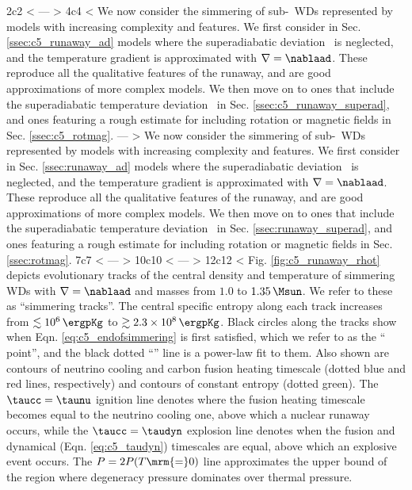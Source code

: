 2c2
< \label{sec:c5_results}
---
> \label{sec:results}
4c4
< We now consider the simmering of sub-\Mch\ WDs represented by models with increasing complexity and features.  We first consider in Sec. \ref{ssec:c5_runaway_ad} models where the superadiabatic deviation \dnabconv\ is neglected, and the temperature gradient is approximated with $\nabla = \nablaad$. These reproduce all the qualitative features of the runaway, and are good approximations of more complex models.  We then move on to ones that include the superadiabatic temperature deviation \dnabconv\ in Sec. \ref{ssec:c5_runaway_superad}, and ones featuring a rough estimate for including rotation or magnetic fields in Sec. \ref{ssec:c5_rotmag}.
---
> We now consider the simmering of sub-\Mch\ WDs represented by models with increasing complexity and features.  We first consider in Sec. \ref{ssec:runaway_ad} models where the superadiabatic deviation \dnabconv\ is neglected, and the temperature gradient is approximated with $\nabla = \nablaad$. These reproduce all the qualitative features of the runaway, and are good approximations of more complex models.  We then move on to ones that include the superadiabatic temperature deviation \dnabconv\ in Sec. \ref{ssec:runaway_superad}, and ones featuring a rough estimate for including rotation or magnetic fields in Sec. \ref{ssec:rotmag}.
7c7
< \label{ssec:c5_runaway_ad}
---
> \label{ssec:runaway_ad}
10c10
< \label{ssec:c5_runaway_ad_analysis}
---
> \label{ssec:runaway_ad_analysis}
12c12
< Fig. \ref{fig:c5_runaway_rhot} depicts evolutionary tracks of the central density and temperature of simmering WDs with $\nabla = \nablaad$ and masses from $1.0$ to $1.35\,\Msun$.  We refer to these as ``simmering tracks''.  The central specific entropy along each track increases from $\lesssim10^6\,\ergpKg$ to $\gtrsim2.3\times10^8\,\ergpKg$.  Black circles along the tracks show when Eqn. \ref{eq:c5_endofsimmering} is first satisfied, which we refer to as the ``\citeal{wooswk04} point'', and the black dotted ``\citeal{wooswk04}'' line is a power-law fit to them.  Also shown are contours of neutrino cooling and carbon fusion heating timescale (dotted blue and red lines, respectively) and contours of constant entropy (dotted green).  The $\taucc = \taunu$ ignition line denotes where the fusion heating timescale becomes equal to the neutrino cooling one, above which a nuclear runaway occurs, while the $\taucc = \taudyn$ explosion line denotes when the fusion and dynamical (Eqn. \ref{eq:c5_taudyn}) timescales are equal, above which an explosive event occurs.  The $P = 2P(T\mrm{=}0)$ line approximates the upper bound of the region where degeneracy pressure dominates over thermal pressure.
